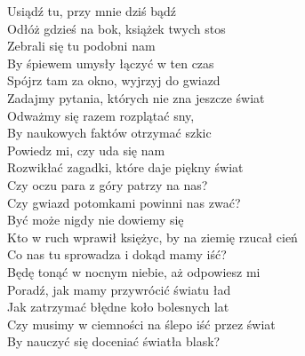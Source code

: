 \begin{flushleft}    
Usiądź tu, przy mnie dziś bądź\\
Odłóż gdzieś na bok, książek twych stos\\
Zebrali się tu podobni nam\\
By śpiewem umysły łączyć w ten czas\\
\hop
Spójrz tam za okno, wyjrzyj do gwiazd\\
Zadajmy pytania, których nie zna jeszcze świat\\
Odważmy się razem rozplątać sny, \\
By naukowych faktów otrzymać szkic\\
\hops
Powiedz mi, czy uda się nam\\
Rozwikłać zagadki, które daje piękny świat\\
Czy oczu para z góry patrzy na nas? \\
Czy gwiazd potomkami powinni nas zwać?\\
\hop
Być może nigdy nie dowiemy się \\
Kto w ruch wprawił księżyc, by na ziemię rzucał cień\\ 
Co nas tu sprowadza i dokąd mamy iść?\\
Będę tonąć w nocnym niebie, aż odpowiesz mi\\
\hop
Poradź, jak mamy przywrócić światu ład\\
Jak zatrzymać błędne koło bolesnych lat\\
Czy musimy w ciemności na ślepo iść przez świat\\
By nauczyć się doceniać światła blask?\\
\end{flushleft}
\newpage